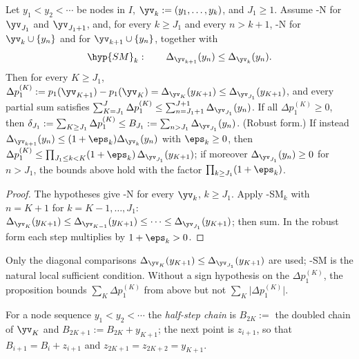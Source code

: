 \begin{proposition}\label{prop:tail-general}
Let $y_1<y_2<\cdots$ be nodes in $I$, $\yv_k:=(y_1,\dots,y_k)$, and $J_1\ge1$. Assume \hyp{N} for $\yv_{J_1}$ and
$\yv_{J_1+1}$, and, for every $k\ge J_1$ and every $n>k+1$, \hyp{N} for $\yv_k\cup\{y_n\}$ and for
$\yv_{k+1}\cup\{y_n\}$, together with
\[
\hyp{SM}_k:\qquad \Delta_{\yv_{k+1}}(y_n)\le\Delta_{\yv_k}(y_n).
\]
Then for every $K\ge J_1$,
$\Delta p_1^{(K)}:=p_1(\yv_{K+1})-p_1(\yv_K)=\Delta_{\yv_K}(y_{K+1})\le\Delta_{\yv_{J_1}}(y_{K+1})$, and every partial sum
satisfies $\sum_{K=J_1}^{J}\Delta p_1^{(K)}\le\sum_{n=J_1+1}^{J+1}\Delta_{\yv_{J_1}}(y_n)$. If all $\Delta p_1^{(K)}\ge0$,
then $\delta_{J_1}:=\sum_{K\ge J_1}\Delta p_1^{(K)}\le B_{J_1}:=\sum_{n>J_1}\Delta_{\yv_{J_1}}(y_n)$.
(Robust form.) If instead $\Delta_{\yv_{k+1}}(y_n)\le(1+\eps_k)\Delta_{\yv_k}(y_n)$ with $\eps_k\ge0$, then
$\Delta p_1^{(K)}\le\prod_{J_1\le k<K}(1+\eps_k)\,\Delta_{\yv_{J_1}}(y_{K+1})$; if moreover $\Delta_{\yv_{J_1}}(y_n)\ge0$ for
$n>J_1$, the bounds above hold with the factor $\prod_{k\ge J_1}(1+\eps_k)$.
\end{proposition}

\begin{proof}
The hypotheses give \hyp{N} for every $\yv_k$, $k\ge J_1$. Apply \hyp{SM}$_k$ with $n=K+1$ for $k=K-1,\dots,J_1$:
$\Delta_{\yv_K}(y_{K+1})\le\Delta_{\yv_{K-1}}(y_{K+1})\le\dots\le\Delta_{\yv_{J_1}}(y_{K+1})$; then sum. In the robust form
each step multiplies by $1+\eps_k>0$.
\end{proof}

Only the diagonal comparisons $\Delta_{\yv_K}(y_{K+1})\le\Delta_{\yv_{J_1}}(y_{K+1})$ are used; \hyp{SM} is the natural
local sufficient condition. Without a sign hypothesis on the $\Delta p_1^{(K)}$, the proposition bounds
$\sum_K\Delta p_1^{(K)}$ from above but not $\sum_K\lvert\Delta p_1^{(K)}\rvert$.

For a node sequence $y_1<y_2<\cdots$ the \emph{half-step chain} is $B_{2K}:=$ the doubled chain of $\yv_K$ and
$B_{2K+1}:=B_{2K}+y_{K+1}$; the next point is $z_{i+1}$, so that $B_{i+1}=B_i+z_{i+1}$ and
$z_{2K+1}=z_{2K+2}=y_{K+1}$.

